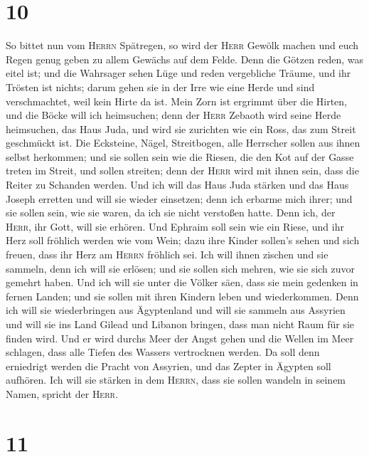 \hypertarget{section-9}{%
\section{10}\label{section-9}}

 So bittet nun vom \textsc{Herrn} Spätregen, so wird der
\textsc{Herr} Gewölk machen und euch Regen genug geben zu allem Gewächs
auf dem Felde.  Denn die Götzen reden, was eitel ist; und
die Wahrsager sehen Lüge und reden vergebliche Träume, und ihr Trösten
ist nichts; darum gehen sie in der Irre wie eine Herde und sind
verschmachtet, weil kein Hirte da ist.  Mein Zorn ist
ergrimmt über die Hirten, und die Böcke will ich heimsuchen; denn der
\textsc{Herr} Zebaoth wird seine Herde heimsuchen, das Haus Juda, und
wird sie zurichten wie ein Ross, das zum Streit geschmückt ist.
 Die Ecksteine, Nägel, Streitbogen, alle Herrscher sollen
aus ihnen selbst herkommen;  und sie sollen sein wie die
Riesen, die den Kot auf der Gasse treten im Streit, und sollen streiten;
denn der \textsc{Herr} wird mit ihnen sein, dass die Reiter zu Schanden
werden.  Und ich will das Haus Juda stärken und das Haus
Joseph erretten und will sie wieder einsetzen; denn ich erbarme mich
ihrer; und sie sollen sein, wie sie waren, da ich sie nicht verstoßen
hatte. Denn ich, der \textsc{Herr}, ihr Gott, will sie erhören.
 Und Ephraim soll sein wie ein Riese, und ihr Herz soll
fröhlich werden wie vom Wein; dazu ihre Kinder sollen's sehen und sich
freuen, dass ihr Herz am \textsc{Herrn} fröhlich sei.  Ich
will ihnen zischen und sie sammeln, denn ich will sie erlösen; und sie
sollen sich mehren, wie sie sich zuvor gemehrt haben.  Und
ich will sie unter die Völker säen, dass sie mein gedenken in fernen
Landen; und sie sollen mit ihren Kindern leben und wiederkommen.
 Denn ich will sie wiederbringen aus Ägyptenland und will
sie sammeln aus Assyrien und will sie ins Land Gilead und Libanon
bringen, dass man nicht Raum für sie finden wird.  Und er
wird durchs Meer der Angst gehen und die Wellen im Meer schlagen, dass
alle Tiefen des Wassers vertrocknen werden. Da soll denn erniedrigt
werden die Pracht von Assyrien, und das Zepter in Ägypten soll aufhören.
 Ich will sie stärken in dem \textsc{Herrn}, dass sie
sollen wandeln in seinem Namen, spricht der \textsc{Herr}.

\hypertarget{section-10}{%
\section{11}\label{section-10}}

